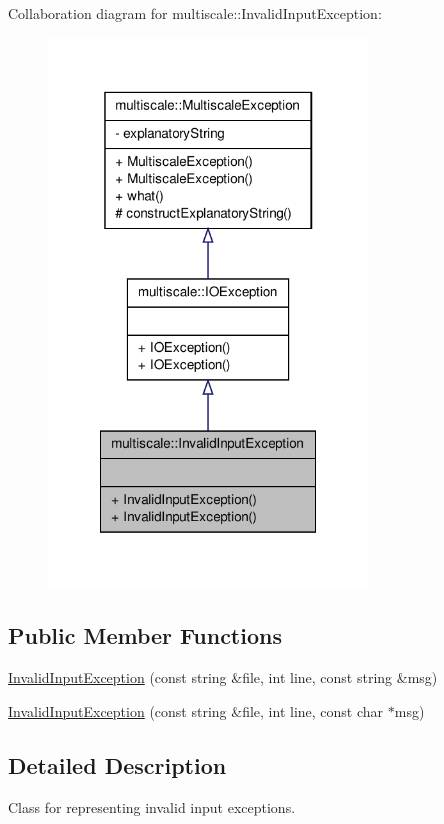 \-Collaboration diagram for multiscale\-:\-:\-Invalid\-Input\-Exception\-:
\nopagebreak
\begin{figure}[H]
\begin{center}
\leavevmode
\includegraphics[width=240pt]{classmultiscale_1_1InvalidInputException__coll__graph}
\end{center}
\end{figure}
\subsection*{\-Public \-Member \-Functions}
\begin{DoxyCompactItemize}
\item 
\hyperlink{classmultiscale_1_1InvalidInputException_aea7260856bd45bd4443d7626de243b72}{\-Invalid\-Input\-Exception} (const string \&file, int line, const string \&msg)
\item 
\hyperlink{classmultiscale_1_1InvalidInputException_af12fa935cdc2aacbba5ea8cda0ef8df1}{\-Invalid\-Input\-Exception} (const string \&file, int line, const char $\ast$msg)
\end{DoxyCompactItemize}


\subsection{\-Detailed \-Description}
\-Class for representing invalid input exceptions. 

